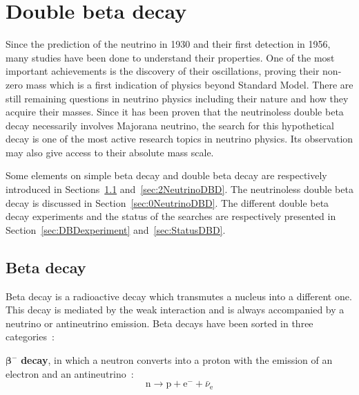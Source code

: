 \documentclass[main.tex]{subfiles}
\begin{document}
\chapter{Double beta decay}
 
 


\NI Since the prediction of the neutrino in 1930 and their first detection in 1956, many studies have been done to understand their properties. One of the most important achievements is the discovery of their oscillations, proving their non-zero mass which is a first indication of physics beyond Standard Model. There are still remaining questions in neutrino physics including their nature and how they acquire their masses. Since it has been proven that the neutrinoless double beta decay necessarily involves Majorana neutrino, the search for this hypothetical decay is one of the most active research topics in neutrino physics. Its observation may also give access to their absolute mass scale.


\bigskip


\NI Some elements on simple beta decay and double beta decay are respectively introduced in Sections~\ref{sec:betaDecay} and~\ref{sec:2NeutrinoDBD}. The neutrinoless double beta decay is discussed in Section~\ref{sec:0NeutrinoDBD}. The different double beta decay experiments and the status of the searches are respectively presented in Section~\ref{sec:DBDexperiment} and~\ref{sec:StatusDBD}.


\section{Beta decay}\label{sec:betaDecay}


\NI Beta decay is a radioactive decay which transmutes a nucleus into a different one. This decay is mediated by the weak interaction and is always accompanied by a neutrino or antineutrino emission. Beta decays have been sorted in three categories~:


\bigskip


\NI $\boldsymbol{\beta^-}$ \textbf{decay}, in which a neutron converts into a proton with the emission of an electron and an antineutrino~:
\begin{equation}
\text{n} \rightarrow \text{p} + \text{e}^- + \bar{\nu}_\text{e}
\end{equation}
\end{document}
